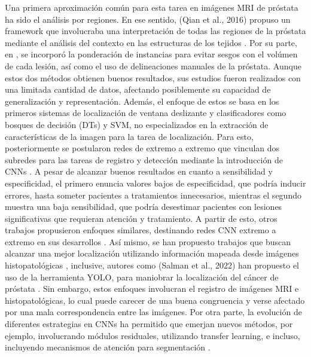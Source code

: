 Una primera aproximación común para esta tarea en imágenes MRI de próstata ha sido el análisis por regiones. En ese sentido, (Qian et al., 2016) propuso un framework que involucraba una interpretación de todas las regiones de la próstata mediante el análisis del contexto en las estructuras de los tejidos . Por su parte, en , se incorporó la ponderación de instancias para evitar sesgos con el volúmen de cada lesión, así como el uso de delineaciones manuales de la próstata.  Aunque estos dos métodos obtienen buenos resultados, sus estudios fueron realizados con una limitada cantidad de datos, afectando posiblemente su capacidad de generalización y representación. Además, el enfoque de estos se basa en los primeros sistemas de localización de ventana deslizante y clasificadores como bosques de decisión (DTs) y SVM, no especializados en la extracción de características de la imagen para la tarea de localización. Para esto, posteriormente se postularon redes de extremo a extremo que vinculan dos subredes para las tareas de registro y detección mediante la introducción de CNNs . A pesar de alcanzar buenos resultados en cuanto a sensibilidad y especificidad, el primero enuncia valores bajos de especificidad, que podría inducir errores, hasta someter pacientes a tratamientos innecesarios, mientras el segundo muestra una baja sensibilidad, que podría desestimar pacientes con lesiones significativas que requieran atención y tratamiento. A partir de esto, otros trabajos propusieron enfoques similares, destinando redes CNN extremo a extremo en sus desarrollos . Así mismo, se han propuesto trabajos que buscan alcanzar una mejor localización utilizando información mapeada desde imágenes histopatológicas , inclusive, autores como (Salman et al., 2022) han propuesto el uso de la herramienta YOLO, para maniobrar la localización del cáncer de próstata . Sin embargo, estos enfoques involucran el registro de imágenes MRI e histopatológicas, lo cual puede carecer de una buena congruencia y verse afectado por una mala correspondencia entre las imágenes. Por otra parte, la evolución de diferentes estrategias en CNNs ha permitido que emerjan nuevos métodos, por ejemplo, involucrando módulos residuales, utilizando transfer learning, e incluso, incluyendo mecanismos de atención para segmentación . 
